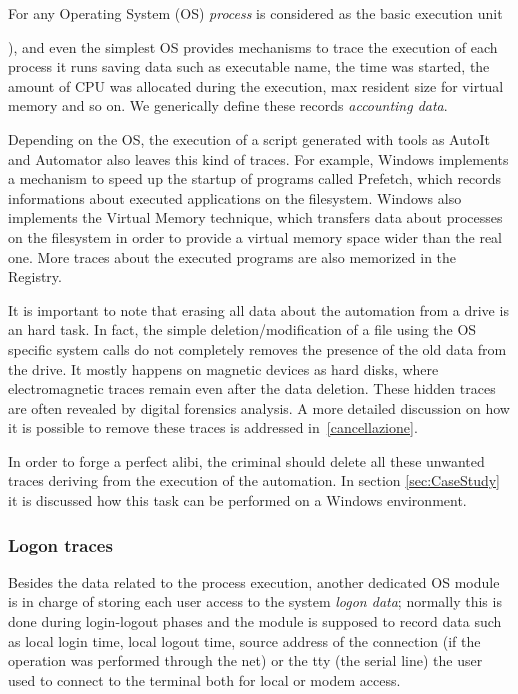 \documentclass[runningheads,english]{llncs}
\begin{document}
For any Operating System (OS) {\em process} is considered as the basic execution
unit {\cite{kkk} ), and even the simplest OS provides mechanisms to trace the
execution of each process it runs saving data such as executable name, the time
was started, the amount of CPU was allocated during the execution, max resident
size for virtual memory and so on. We generically define these records {\em
accounting data}. 

Depending on the OS, the execution of a script generated with tools as AutoIt and Automator also leaves this kind of traces. For example, Windows implements a mechanism to speed up the startup of programs called Prefetch\cite{prefetch}, which records informations about executed applications on the filesystem. Windows also implements the Virtual Memory technique\cite{virtualmem}, which transfers data about processes on the filesystem in order to provide a virtual memory space wider than the real one. More traces about the executed programs are also memorized in the Registry.

It is important to note that erasing all data about the automation from a drive is an hard task. In fact, the simple deletion/modification of a file using the OS specific system calls do not completely removes the presence of the old data from the drive. It mostly happens on magnetic devices as hard disks, where electromagnetic traces remain even after the data deletion. These hidden traces are often revealed by digital forensics analysis. A more detailed discussion on how it is possible to remove these traces is addressed in~\ref{cancellazione}.    

In order to forge a perfect alibi, the criminal should delete all these unwanted traces deriving from the execution of the automation.
In section \ref{sec:CaseStudy} it is discussed how this task can be performed on a Windows environment.

\subsubsection{Logon traces}

Besides the data related to the process execution, another dedicated OS module
is in charge of storing each user access to the system {\em logon data};
normally this is done during login-logout phases and the module is supposed to
record data such as local login time, local logout time, source address of the
connection (if the operation was performed through the net) or the tty (the
serial line) the user used to connect to the terminal both for local or modem
access. 

}
\end{document}
